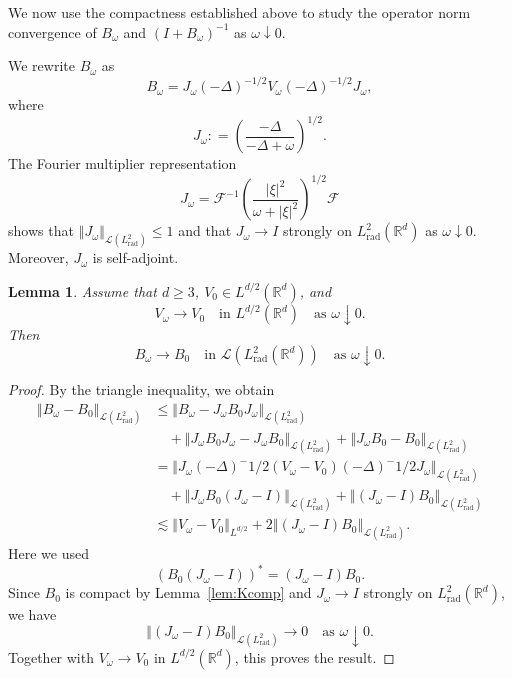 \documentclass[12pt, a4paper, reqno]{amsart}
\numberwithin{equation}{section}
\newtheorem{lemma}[theorem]{Lemma}
\theoremstyle{definition}
\theoremstyle{remark}
\newtheorem{remark}[theorem]{Remark}
\newcommand{\R}{\mathbb R}
\def\norm[#1]{{\left\Vert #1 \right\Vert}}
\newcommand{\rad}{\mathrm{rad}}
\newcommand{\ce}{\mathrel{\mathop:}=}
\begin{document}
We now use the compactness established above to study the
operator norm convergence of $B_\omega$ and $(I+B_\omega)^{-1}$
as $\omega\downarrow0$.

We rewrite $B_\omega$ as
\[
  B_\omega
  =J_\omega(-\Delta)^{-1/2}
    V_\omega
    (-\Delta)^{-1/2}J_\omega,
\]
where
\[
  J_\omega
  \ce\left(\frac{-\Delta}{-\Delta+\omega}\right)^{1/2}.
\]
The Fourier multiplier representation
\[
  J_\omega
  =\mathcal{F}^{-1}
    \left(\frac{|\xi|^2}{\omega+|\xi|^2}\right)^{1/2}
    \mathcal{F}
\]
shows that $\norm[J_\omega]_{\mathcal{L}(L^2_{\rad})}\le1$ and that
$J_\omega\to I$ strongly on $L^2_{\rad}(\R^d)$ as $\omega\downarrow0$.
Moreover, $J_\omega$ is self-adjoint.


\begin{lemma}\label{lem:Kconv}
Assume that $d\ge3$, $V_0\in L^{d/2}(\R^d)$, and
\[
  V_\omega\to V_0
  \quad\text{in }L^{d/2}(\R^d)
  \quad\text{as }\omega\downarrow0.
\]
Then
\[
  B_\omega\to B_0
  \quad\text{in }\mathcal{L}(L^2_{\rad}(\R^d))
  \quad\text{as }\omega\downarrow0.
\]
\end{lemma}

\begin{proof}
By the triangle inequality, we obtain
\begin{align*}
\norm[B_\omega-B_0]_{\mathcal{L}(L^2_{\rad})}
  &\le
  \norm[B_\omega-J_\omega B_0J_\omega]_{\mathcal{L}(L^2_{\rad})}
  \\
  &\quad+
  \norm[J_\omega B_0J_\omega-J_\omega B_0]_{\mathcal{L}(L^2_{\rad})}
  +\norm[J_\omega B_0-B_0]_{\mathcal{L}(L^2_{\rad})}
  \\
  &=\norm[
    J_\omega(-\Delta)^{-1/2}
    (V_\omega-V_0)
    (-\Delta)^{-1/2}J_\omega
  ]_{\mathcal{L}(L^2_{\rad})}
  \\
  &\quad+
  \norm[J_\omega B_0(J_\omega-I)]_{\mathcal{L}(L^2_{\rad})}
  +\norm[(J_\omega-I)B_0]_{\mathcal{L}(L^2_{\rad})}
  \\
  &\lesssim
  \norm[V_\omega-V_0]_{L^{d/2}}
  +2\norm[(J_\omega-I)B_0]_{\mathcal{L}(L^2_{\rad})}.
\end{align*}
Here we used
\[
  (B_0(J_\omega-I))^*=(J_\omega-I)B_0.
\]
Since $B_0$ is compact by Lemma~\ref{lem:Kcomp} and
$J_\omega\to I$ strongly on $L^2_{\rad}(\R^d)$, we have
\[
  \norm[(J_\omega-I)B_0]_{\mathcal{L}(L^2_{\rad})}\to0
  \quad\text{as }\omega\downarrow0.
\]
Together with
$V_\omega\to V_0$ in $L^{d/2}(\R^d)$, this proves the result.
\end{proof}
\end{document}
